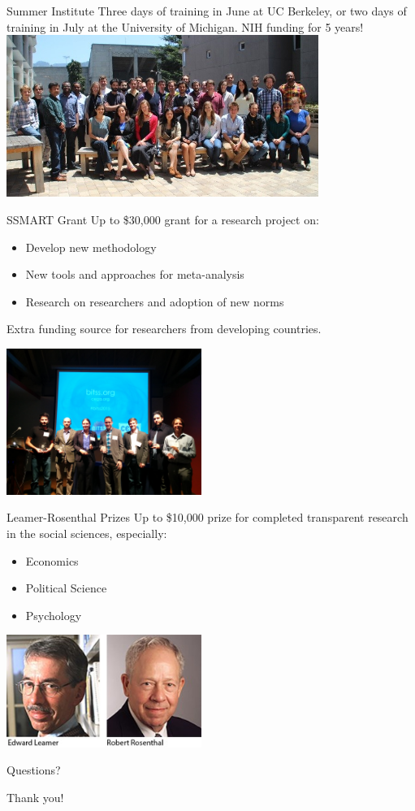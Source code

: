 \documentclass{beamer}
\begin{document}
\begin{frame}{Summer Institute}
Three days of training in June at UC Berkeley, or two days of training in July at the University of Michigan. NIH funding for 5 years!
\includegraphics[width=4in]{../Images/bitss-2014-cohort2.jpg}
\end{frame}

\begin{frame}{SSMART Grant}
Up to \$30,000 grant for a research project on:
\begin{itemize}[<.->]
\item Develop new methodology
\item New tools and approaches for meta-analysis
\item Research on researchers and adoption of new norms
\end{itemize}
Extra funding source for researchers from developing countries.

\includegraphics[width=2.5in]{../Images/LRwinners.jpg}
\end{frame}

\begin{frame}{Leamer-Rosenthal Prizes}
Up to \$10,000 prize for completed transparent research in the social sciences,
especially:
\begin{itemize}[<.->]
\item Economics
\item Political Science
\item Psychology
\end{itemize}
\includegraphics[width=2.5in]{../Images/leamer1-zoomed33.jpg}
\end{frame}


\begin{frame}
\begin{center}
Questions?
\vspace{1in}


\Huge{Thank you!}
\end{center}
\end{frame}
\end{document}
